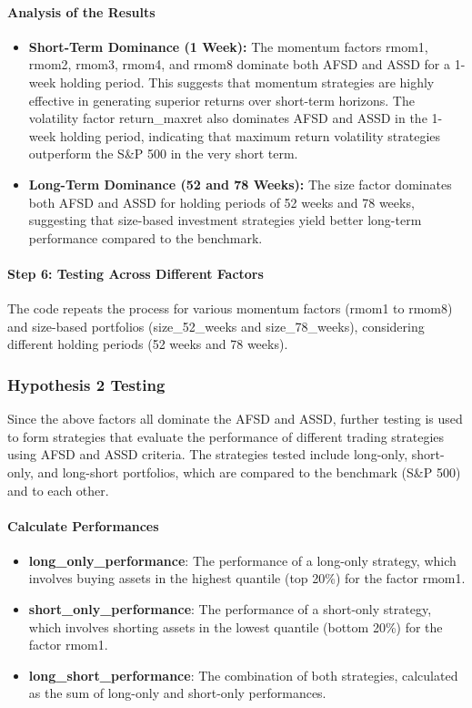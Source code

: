 \documentclass{article}
\begin{document}
\paragraph{Analysis of the Results}
\begin{itemize}
    \item \textbf{Short-Term Dominance (1 Week):} The momentum factors rmom1, rmom2, rmom3, rmom4, and rmom8 dominate both AFSD and ASSD for a 1-week holding period. This suggests that momentum strategies are highly effective in generating superior returns over short-term horizons. The volatility factor return\_maxret also dominates AFSD and ASSD in the 1-week holding period, indicating that maximum return volatility strategies outperform the S\&P 500 in the very short term.
    \item \textbf{Long-Term Dominance (52 and 78 Weeks):} The size factor dominates both AFSD and ASSD for holding periods of 52 weeks and 78 weeks, suggesting that size-based investment strategies yield better long-term performance compared to the benchmark.
\end{itemize}

\paragraph{Step 6: Testing Across Different Factors}
The code repeats the process for various momentum factors (rmom1 to rmom8) and size-based portfolios (size\_52\_weeks and size\_78\_weeks), considering different holding periods (52 weeks and 78 weeks).

\subsubsection{Hypothesis 2 Testing}
Since the above factors all dominate the AFSD and ASSD, further testing is used to form strategies that evaluate the performance of different trading strategies using AFSD and ASSD criteria. The strategies tested include long-only, short-only, and long-short portfolios, which are compared to the benchmark (S\&P 500) and to each other.

\paragraph{Calculate Performances}
\begin{itemize}
    \item \textbf{long\_only\_performance}: The performance of a long-only strategy, which involves buying assets in the highest quantile (top 20\%) for the factor rmom1.
    \item \textbf{short\_only\_performance}: The performance of a short-only strategy, which involves shorting assets in the lowest quantile (bottom 20\%) for the factor rmom1.
    \item \textbf{long\_short\_performance}: The combination of both strategies, calculated as the sum of long-only and short-only performances.
\end{itemize}
\end{document}

